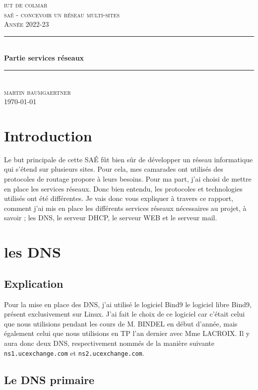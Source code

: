 \documentclass[12pt, a4paper]{article}
\begin{document}
\begin{titlepage}
	\newcommand{\HRule}{\rule{\linewidth}{0.5mm}} 
	\center 
	\textsc{\LARGE iut de colmar}\\[6.5cm] 
	\textsc{\Large saé - concevoir un réseau multi-sites}\\[0.5cm] 
	\textsc{\large Année 2022-23}\\[0.5cm]
	\HRule\\[0.75cm]
	{\huge\bfseries Partie services réseaux}\\[0.4cm]
	\HRule\\[1.5cm]
	\textsc{\large martin baumgaertner}\\[6.5cm] 

	\vfill\vfill\vfill
	{\large\today} 
	\vfill
\end{titlepage}
\newpage
\tableofcontents
\newpage
\section{Introduction}
Le but principale de cette SAÉ fût bien sûr de développer un réseau informatique
qui s'étend sur plusieurs sites. Pour cela, mes camarades ont utilisés des protocoles
de routage propore à leurs besoins. Pour ma part, j'ai choisi de mettre en place
les services réseaux. Donc bien entendu, les protocoles et technologies utilisés
ont été différentes. Je vais donc vous expliquer à travers ce rapport, comment
j'ai mis en place les différents services réseaux nécessaires au projet,
à savoir ; les DNS, le serveur DHCP, le serveur WEB et le serveur mail.


\section{les DNS}
    \subsection{Explication}
    Pour la mise en place des DNS, j'ai utilisé le logiciel Bind9 
    le logiciel libre Bind9, présent exclusivement sur Linux. J'ai fait 
    le choix de ce logiciel car c'était celui que nous utilisions pendant
    les cours de M. BINDEL en début d'année, mais également celui que nous 
    utilisions en TP l'an dernier avec Mme LACROIX. Il y aura donc deux DNS, 
    respectivement nommés de la manière suivante \texttt{ns1.ucexchange.com}
    et \texttt{ns2.ucexchange.com}. 


    \subsection{Le DNS primaire}
    
\end{document}
